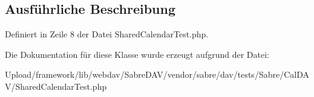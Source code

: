 \subsection{Ausführliche Beschreibung}


Definiert in Zeile 8 der Datei Shared\+Calendar\+Test.\+php.



Die Dokumentation für diese Klasse wurde erzeugt aufgrund der Datei\+:\begin{DoxyCompactItemize}
\item 
Upload/framework/lib/webdav/\+Sabre\+D\+A\+V/vendor/sabre/dav/tests/\+Sabre/\+Cal\+D\+A\+V/Shared\+Calendar\+Test.\+php\end{DoxyCompactItemize}
